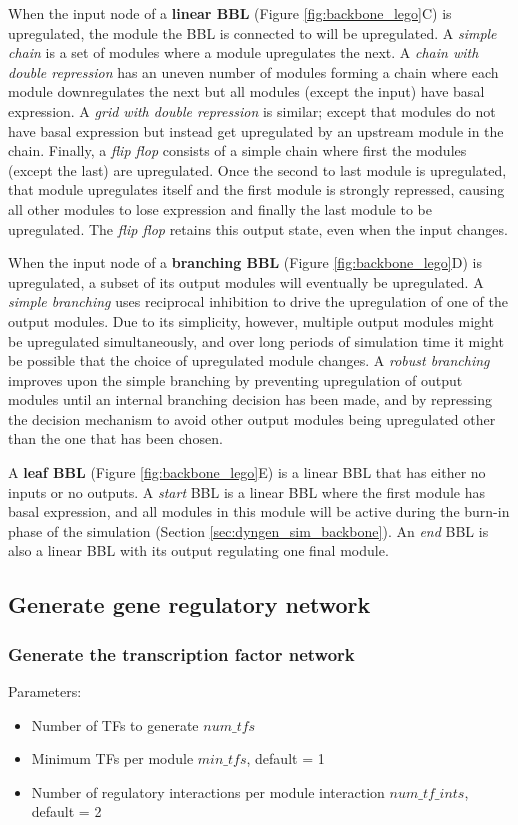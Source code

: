 When the input node of a \textbf{linear BBL} (Figure \ref{fig:backbone_lego}C) is upregulated, the module the BBL is connected to will be upregulated. A \emph{simple chain} is a set of modules where a module upregulates the next. A \emph{chain with double repression} has an uneven number of modules forming a chain where each module downregulates the next but all modules (except the input) have basal expression. A \emph{grid with double repression} is similar; except that modules do not have basal expression but instead get upregulated by an upstream module in the chain. Finally, a \emph{flip flop} consists of a simple chain where first the modules (except the last) are upregulated. Once the second to last module is upregulated, that module upregulates itself and the first module is strongly repressed, causing all other modules to lose expression and finally the last module to be upregulated. The \emph{flip flop} retains this output state, even when the input changes.

When the input node of a \textbf{branching BBL} (Figure \ref{fig:backbone_lego}D) is upregulated, a subset of its output modules will eventually be upregulated. A \emph{simple branching} uses reciprocal inhibition to drive the upregulation of one of the output modules. Due to its simplicity, however, multiple output modules might be upregulated simultaneously, and over long periods of simulation time it might be possible that the choice of upregulated module changes. A \emph{robust branching} improves upon the simple branching by preventing upregulation of output modules until an internal branching decision has been made, and by repressing the decision mechanism to avoid other output modules being upregulated other than the one that has been chosen.

A \textbf{leaf BBL} (Figure \ref{fig:backbone_lego}E) is a linear BBL that has either no inputs or no outputs. A \emph{start} BBL is a linear BBL where the first module has basal expression, and all modules in this module will be active during the burn-in phase of the simulation (Section \ref{sec:dyngen_sim_backbone}). An \emph{end} BBL is also a linear BBL with its output regulating one final module. 


\subsection{Generate gene regulatory network}

\subsubsection{Generate the transcription factor network}
Parameters: 
\begin{itemize}
	\item Number of TFs to generate $num\_tfs$
	\item Minimum TFs per module $min\_tfs$, default = 1
	\item Number of regulatory interactions per module interaction $num\_tf\_ints$, default = 2
\end{itemize}

